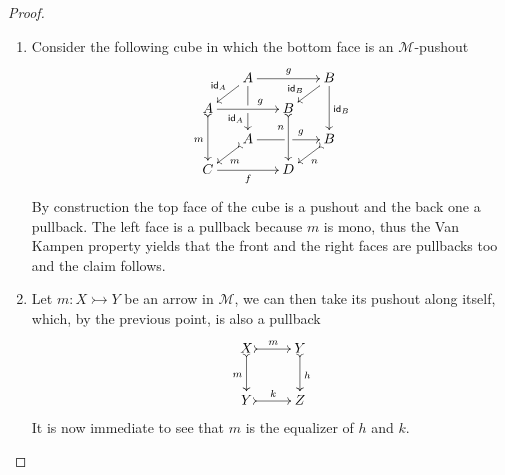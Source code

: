 \documentclass[3p]{elsarticle}
\def\C{\textbf {\textup{C}}}
\newcommand{\mto}{\rightarrowtail}
\newcommand{\id}[1]{\mathsf{id}_{#1}}
\theoremstyle{remark}
\theoremstyle{definition}
\begin{document}
\rgmono*
\begin{proof}\label{regmono-proof}
	\begin{enumerate}
		\item  Consider the following cube in which the bottom face is an $\mathcal{M}$-pushout
		\[\xymatrix@C=15pt@R=9pt{&A\ar[dd]|\hole_(.65){\id{A}}\ar[rr]^{g} \ar[dl]_{\id{A}} && B \ar[dd]^{\id{B}} \ar[dl]_(.6){\id{B}} \\ A  \ar@{>->}[dd]_{m}\ar[rr]^(.65){g} & & B \ar@{>->}[dd]_(.3){n}\\&A\ar[rr]|\hole^(.65){g} \ar@{>->}[dl]^{m} && B \ar@{>->}[dl]^{n} \\C \ar[rr]_{f} & & D}\]
		By construction the top face of the cube is a pushout and the back one a pullback. The left face is a pullback because $m$ is mono, thus the Van Kampen property yields that the front and the right faces are pullbacks too and the claim follows.
		\item Let $m\colon X\mto Y$ be an arrow in $\mathcal{M}$, we can then take its pushout along itself, which, by the previous point, is also a pullback
		\[\xymatrix{X \ar@{>->}[r]^{m} \ar@{>->}[d]_{m}& Y \ar@{>->}[d]^{h}\\ Y \ar@{>->}[r]^{k} & Z}\]
		It is now immediate to see that $m$ is the equalizer of $h$ and $k$.   \qedhere
	\end{enumerate}
\end{proof}
\end{document}
